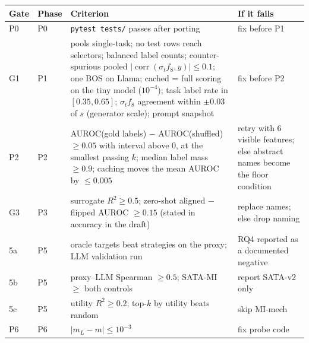 \documentclass[11pt,a4paper]{article}
\newcommand{\1}{\mathbf{1}}
\DeclareMathOperator{\corr}{corr}
\theoremstyle{plain}
\theoremstyle{definition}
\theoremstyle{remark}
\begin{document}
\begin{center}
\begin{tabular}{L{1.1cm}L{1.2cm}L{8.1cm}L{4.6cm}}
\toprule
\textbf{Gate} & \textbf{Phase} & \textbf{Criterion} & \textbf{If it fails} \\
\midrule
P0 & P0 & \texttt{pytest tests/} passes after porting & fix before P1 \\
G1 & P1 & pools single-task; no test rows reach selectors; balanced label
counts; counter-spurious pooled $|\corr(\sigma_t f_8, y)| \leq 0.1$; one BOS on Llama;
cached = full scoring on the tiny model ($10^{-4}$); task label rate in
$[0.35, 0.65]$; $\sigma_t f_8$ agreement within $\pm 0.03$ of $s$ (generator scale);
prompt snapshot & fix before P2 \\
P2 & P2 & AUROC(gold labels) $-$ AUROC(shuffled) $\geq 0.05$ with interval
above 0, at the smallest passing $k$; median label mass $\geq 0.9$; caching
moves the mean AUROC by $\leq 0.005$ &
retry with 6 visible features; else abstract names become the floor
condition \\
G3 & P3 & surrogate $R^2 \geq 0.5$; zero-shot aligned $-$ flipped AUROC
$\geq 0.15$ (stated in accuracy in the draft) & replace names; else drop naming \\
5a & P5 & oracle targets beat strategies on the proxy; LLM validation run &
RQ4 reported as a documented negative \\
5b & P5 & proxy--LLM Spearman $\geq 0.5$; SATA-MI $\geq$ both controls &
report SATA-v2 only \\
5c & P5 & utility $R^2 \geq 0.2$; top-$k$ by utility beats random & skip
MI-mech \\
P6 & P6 & $|m_L - m| \leq 10^{-3}$ & fix probe code \\
\bottomrule
\end{tabular}
\end{center}
\end{document}
